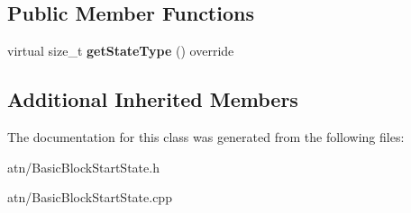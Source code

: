 \subsection*{Public Member Functions}
\begin{DoxyCompactItemize}
\item 
\mbox{\label{classantlr4_1_1atn_1_1BasicBlockStartState_a7cad456274fe68f39e94708f536b72c9}} 
virtual size\+\_\+t {\bfseries get\+State\+Type} () override
\end{DoxyCompactItemize}
\subsection*{Additional Inherited Members}


The documentation for this class was generated from the following files\+:\begin{DoxyCompactItemize}
\item 
atn/Basic\+Block\+Start\+State.\+h\item 
atn/Basic\+Block\+Start\+State.\+cpp\end{DoxyCompactItemize}
